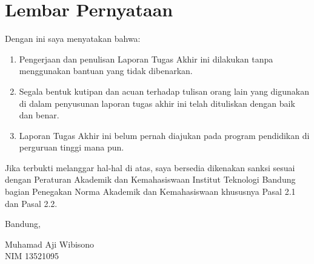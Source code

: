 \chapter*{Lembar Pernyataan}

Dengan ini saya menyatakan bahwa:

\begin{enumerate}

  \item Pengerjaan dan penulisan Laporan Tugas Akhir ini dilakukan tanpa menggunakan bantuan yang tidak dibenarkan.
  \item Segala bentuk kutipan dan acuan terhadap tulisan orang lain yang digunakan di dalam penyusunan laporan tugas akhir ini telah dituliskan dengan baik dan benar.
  \item Laporan Tugas Akhir ini belum pernah diajukan pada program pendidikan di perguruan tinggi mana pun.

\end{enumerate}

Jika terbukti melanggar hal-hal di atas, saya bersedia dikenakan sanksi sesuai dengan Peraturan Akademik dan Kemahasiswaan Institut Teknologi Bandung bagian Penegakan Norma Akademik dan Kemahasiswaan khususnya Pasal 2.1 dan Pasal 2.2.
\vspace{15mm}

Bandung, \tanggalpengesahan

\vspace{1.5cm}
Muhamad Aji Wibisono \\
NIM 13521095
